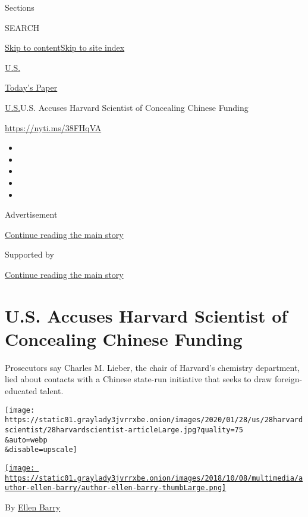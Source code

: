 Sections

SEARCH

\protect\hyperlink{site-content}{Skip to
content}\protect\hyperlink{site-index}{Skip to site index}

\href{https://www.nytimes3xbfgragh.onion/section/us}{U.S.}

\href{https://myaccount.nytimes3xbfgragh.onion/auth/login?response_type=cookie\&client_id=vi}{}

\href{https://www.nytimes3xbfgragh.onion/section/todayspaper}{Today's
Paper}

\href{/section/us}{U.S.}\textbar{}U.S. Accuses Harvard Scientist of
Concealing Chinese Funding

\url{https://nyti.ms/38FHqVA}

\begin{itemize}
\item
\item
\item
\item
\item
\end{itemize}

Advertisement

\protect\hyperlink{after-top}{Continue reading the main story}

Supported by

\protect\hyperlink{after-sponsor}{Continue reading the main story}

\hypertarget{us-accuses-harvard-scientist-of-concealing-chinese-funding}{%
\section{U.S. Accuses Harvard Scientist of Concealing Chinese
Funding}\label{us-accuses-harvard-scientist-of-concealing-chinese-funding}}

Prosecutors say Charles M. Lieber, the chair of Harvard's chemistry
department, lied about contacts with a Chinese state-run initiative that
seeks to draw foreign-educated talent.

\texttt{[image: https://static01.graylady3jvrrxbe.onion/images/2020/01/28/us/28harvardscientist/28harvardscientist-articleLarge.jpg?quality=75\\\&auto=webp\\\&disable=upscale]}

\href{https://www.nytimes3xbfgragh.onion/by/ellen-barry}{\texttt{[image: https://static01.graylady3jvrrxbe.onion/images/2018/10/08/multimedia/author-ellen-barry/author-ellen-barry-thumbLarge.png]}}

By \href{https://www.nytimes3xbfgragh.onion/by/ellen-barry}{Ellen Barry}

